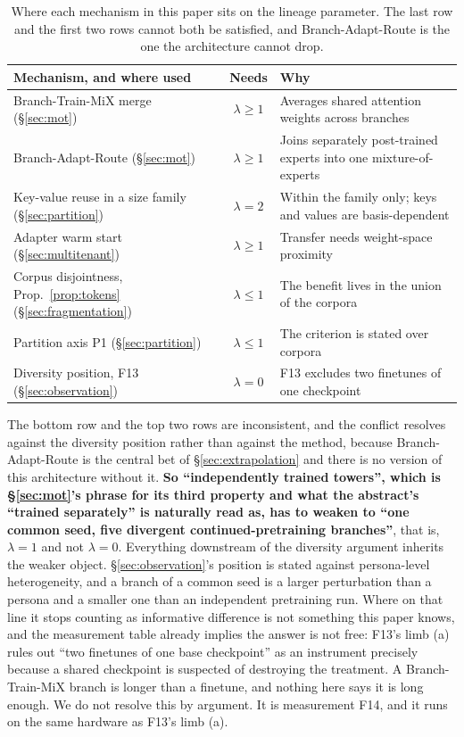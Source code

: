 \documentclass[11pt]{article}
\begin{document}
\begin{table}[h]
\centering
\small
\begin{tabular}{@{}p{}cp{}@{}}
\toprule
\textbf{Mechanism, and where used} & \textbf{Needs} & \textbf{Why} \\
\midrule
Branch-Train-MiX merge (\S\ref{sec:mot}) & $\lambda \geq 1$ & Averages shared attention weights across branches \\
Branch-Adapt-Route (\S\ref{sec:mot}) & $\lambda \geq 1$ & Joins separately post-trained experts into one mixture-of-experts \\
Key-value reuse in a size family (\S\ref{sec:partition}) & $\lambda = 2$ & Within the family only; keys and values are basis-dependent \\
Adapter warm start (\S\ref{sec:multitenant}) & $\lambda \geq 1$ & Transfer needs weight-space proximity \\
Corpus disjointness, Prop.~\ref{prop:tokens} (\S\ref{sec:fragmentation}) & $\lambda \leq 1$ & The benefit lives in the union of the corpora \\
Partition axis P1 (\S\ref{sec:partition}) & $\lambda \leq 1$ & The criterion is stated over corpora \\
Diversity position, F13 (\S\ref{sec:observation}) & $\lambda = 0$ & F13 excludes two finetunes of one checkpoint \\
\bottomrule
\end{tabular}
\caption{Where each mechanism in this paper sits on the lineage parameter. The last row and the first two rows cannot both be satisfied, and Branch-Adapt-Route is the one the architecture cannot drop.}
\label{tab:lineage}
\end{table}

The bottom row and the top two rows are inconsistent, and the conflict resolves against the diversity position rather than against the method, because Branch-Adapt-Route is the central bet of \S\ref{sec:extrapolation} and there is no version of this architecture without it. \textbf{So ``independently trained towers'', which is \S\ref{sec:mot}'s phrase for its third property and what the abstract's ``trained separately'' is naturally read as, has to weaken to ``one common seed, five divergent continued-pretraining branches''}, that is, $\lambda = 1$ and not $\lambda = 0$. Everything downstream of the diversity argument inherits the weaker object. \S\ref{sec:observation}'s position is stated against persona-level heterogeneity, and a branch of a common seed is a larger perturbation than a persona and a smaller one than an independent pretraining run. Where on that line it stops counting as informative difference is not something this paper knows, and the measurement table already implies the answer is not free: F13's limb (a) rules out ``two finetunes of one base checkpoint'' as an instrument precisely because a shared checkpoint is suspected of destroying the treatment. A Branch-Train-MiX branch is longer than a finetune, and nothing here says it is long enough. We do not resolve this by argument. It is measurement F14, and it runs on the same hardware as F13's limb (a).
\end{document}
